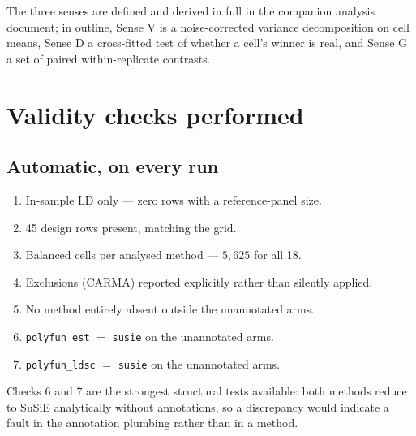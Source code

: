 \documentclass[11pt,a4paper]{article}
\begin{document}
The three senses are defined and derived in full in the companion analysis
document; in outline, Sense V is a noise-corrected variance decomposition on
cell means, Sense D a cross-fitted test of whether a cell's winner is real, and
Sense G a set of paired within-replicate contrasts.

\section{Validity checks performed}\label{sec:checks}

\subsection{Automatic, on every run}
\begin{enumerate}
\item In-sample LD only --- zero rows with a reference-panel size.
\item 45 design rows present, matching the grid.
\item Balanced cells per analysed method --- $5{,}625$ for all 18.
\item Exclusions (CARMA) reported explicitly rather than silently applied.
\item No method entirely absent outside the unannotated arms.
\item \texttt{polyfun\_est} $=$ \texttt{susie} on the unannotated arms.
\item \texttt{polyfun\_ldsc} $=$ \texttt{susie} on the unannotated arms.
\end{enumerate}

Checks 6 and 7 are the strongest structural tests available: both methods reduce
to SuSiE analytically without annotations, so a discrepancy would indicate a
fault in the annotation plumbing rather than in a method.
\end{document}

